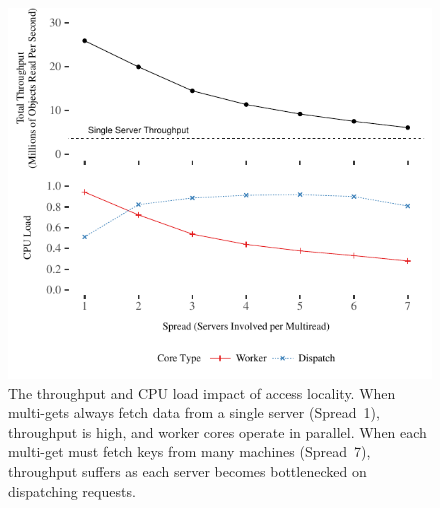 \begin{figure}[t]
\centering
\includegraphics[width=1.0\columnwidth]{graphs/ramcloud-colocation.pdf}
\caption{The throughput and CPU load impact of access locality. When
multi-gets
always fetch data from a single server (Spread~1), throughput is high, and
worker cores operate in parallel. When each multi-get must fetch keys from
many machines (Spread~7), throughput suffers as each server becomes
bottlenecked on dispatching requests.}
\label{fig:colocation}
\end{figure}
